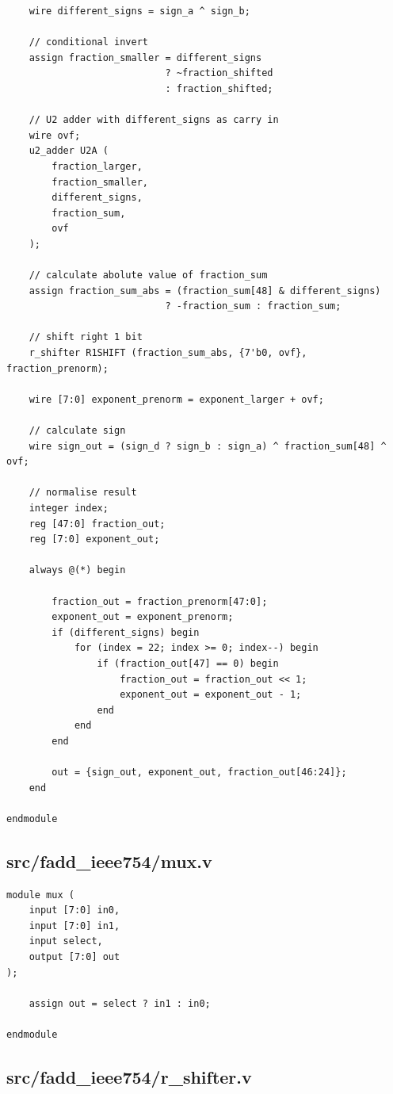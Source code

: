 \documentclass{article}
\begin{document}
\begin{lstlisting}
    wire different_signs = sign_a ^ sign_b;

    // conditional invert
    assign fraction_smaller = different_signs
                            ? ~fraction_shifted
                            : fraction_shifted;

    // U2 adder with different_signs as carry in
    wire ovf;
    u2_adder U2A (
        fraction_larger,
        fraction_smaller,
        different_signs,
        fraction_sum,
        ovf
    );

    // calculate abolute value of fraction_sum
    assign fraction_sum_abs = (fraction_sum[48] & different_signs)
                            ? -fraction_sum : fraction_sum;

    // shift right 1 bit
    r_shifter R1SHIFT (fraction_sum_abs, {7'b0, ovf}, fraction_prenorm);

    wire [7:0] exponent_prenorm = exponent_larger + ovf;

    // calculate sign
    wire sign_out = (sign_d ? sign_b : sign_a) ^ fraction_sum[48] ^ ovf;

    // normalise result
    integer index;
    reg [47:0] fraction_out;
    reg [7:0] exponent_out;

    always @(*) begin

        fraction_out = fraction_prenorm[47:0];
        exponent_out = exponent_prenorm;
        if (different_signs) begin
            for (index = 22; index >= 0; index--) begin
                if (fraction_out[47] == 0) begin
                    fraction_out = fraction_out << 1;
                    exponent_out = exponent_out - 1;
                end
            end
        end

        out = {sign_out, exponent_out, fraction_out[46:24]};
    end

endmodule
\end{lstlisting}

\subsection{src/fadd\_ieee754/mux.v}

\begin{lstlisting}
module mux (
    input [7:0] in0,
    input [7:0] in1,
    input select,
    output [7:0] out
);

    assign out = select ? in1 : in0;

endmodule
\end{lstlisting}

\subsection{src/fadd\_ieee754/r\_shifter.v}
\end{document}
